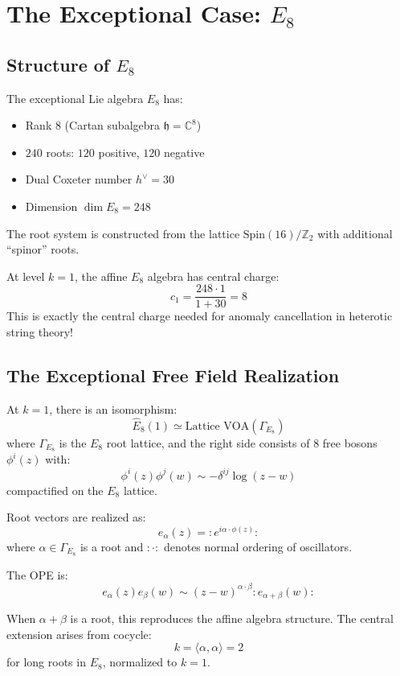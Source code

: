 \section{The Exceptional Case: $E_8$}

\subsection{Structure of $E_8$}

\begin{definition}
The exceptional Lie algebra $E_8$ has:
\begin{itemize}
\item Rank $8$ (Cartan subalgebra $\mathfrak{h} = \mathbb{C}^8$)
\item $240$ roots: $120$ positive, $120$ negative
\item Dual Coxeter number $h^\vee = 30$
\item Dimension $\dim E_8 = 248$
\end{itemize}

The root system is constructed from the lattice $\text{Spin}(16)/\mathbb{Z}_2$ with additional ``spinor'' roots.
\end{definition}

\begin{theorem}
At level $k=1$, the affine $E_8$ algebra has central charge:
$$c_1 = \frac{248 \cdot 1}{1 + 30} = 8$$
This is exactly the central charge needed for anomaly cancellation in heterotic string theory!
\end{theorem}

\subsection{The Exceptional Free Field Realization}

\begin{theorem}
\label{thm:frenkel-kac-e8}
At $k=1$, there is an isomorphism:
$$\widehat{E}_8(1) \simeq \text{Lattice VOA}(\Gamma_{E_8})$$
where $\Gamma_{E_8}$ is the $E_8$ root lattice, and the right side consists of $8$ free bosons $\phi^i(z)$ with:
$$\phi^i(z)\phi^j(w) \sim -\delta^{ij} \log(z-w)$$
compactified on the $E_8$ lattice.
\end{theorem}

\begin{construction}
Root vectors are realized as:
$$e_{\alpha}(z) = : e^{i\alpha \cdot \phi(z)} :$$
where $\alpha \in \Gamma_{E_8}$ is a root and $:\cdot:$ denotes normal ordering of oscillators.

The OPE is:
$$e_{\alpha}(z)e_{\beta}(w) \sim (z-w)^{\alpha \cdot \beta} : e_{\alpha+\beta}(w) :$$

When $\alpha + \beta$ is a root, this reproduces the affine algebra structure. The central extension arises from cocycle:
$$k = \langle \alpha, \alpha \rangle = 2$$
for long roots in $E_8$, normalized to $k=1$.
\end{construction}

